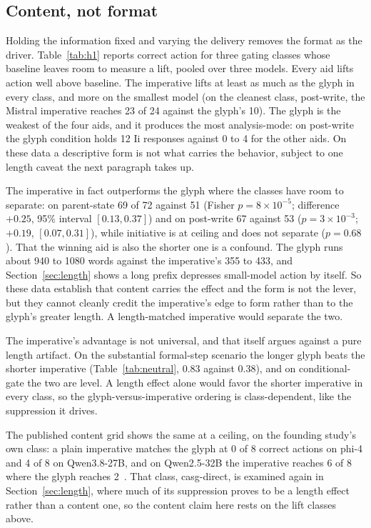 \documentclass[11pt,a4paper]{article}
\begin{document}
\subsection{Content, not format}\label{sec:content}

Holding the information fixed and varying the delivery removes the format as the driver.
Table~\ref{tab:h1} reports correct action for three gating classes whose baseline leaves
room to measure a lift, pooled over three models. Every aid lifts action well above
baseline. The imperative lifts at least as much as the glyph in every class, and more on
the smallest model (on the cleanest class, post-write, the Mistral imperative reaches 23
of 24 against the glyph's 10). The glyph is the weakest of the four aids, and it
produces the most analysis-mode: on post-write the glyph condition holds 12 Ii responses
against 0 to 4 for the other aids. On these data a descriptive form is not what carries
the behavior, subject to one length caveat the next paragraph takes up.

The imperative in fact outperforms the glyph where the classes have room to separate: on
parent-state 69 of 72 against 51 (Fisher $p = 8\times10^{-5}$; difference $+0.25$, 95\%
interval $[0.13, 0.37]$) and on post-write 67 against 53 ($p = 3\times10^{-3}$; $+0.19$,
$[0.07, 0.31]$), while initiative is at ceiling and does not separate ($p = 0.68$). That
the winning aid is also the shorter one is a confound. The glyph runs about 940 to 1080
words against the imperative's 355 to 433, and Section~\ref{sec:length} shows a long
prefix depresses small-model action by itself. So these data establish that content
carries the effect and the form is not the lever, but they cannot cleanly credit the
imperative's edge to form rather than to the glyph's greater length. A length-matched
imperative would separate the two.

The imperative's advantage is not universal, and that itself argues against a pure length
artifact. On the substantial formal-step scenario the longer glyph beats the shorter
imperative (Table~\ref{tab:neutral}, 0.83 against 0.38), and on conditional-gate the two
are level. A length effect alone would favor the shorter imperative in every class, so the
glyph-versus-imperative ordering is class-dependent, like the suppression it drives.

The published content grid shows the same at a ceiling, on the founding study's own
class: a plain imperative matches the glyph at 0 of 8 correct actions on phi-4 and 4 of 8
on Qwen3.8-27B, and on Qwen2.5-32B the imperative reaches 6 of 8 where the glyph reaches
2~\citep{neilson2026content}. That class, casg-direct, is examined again in
Section~\ref{sec:length}, where much of its suppression proves to be a length effect
rather than a content one, so the content claim here rests on the lift classes above.
\end{document}
